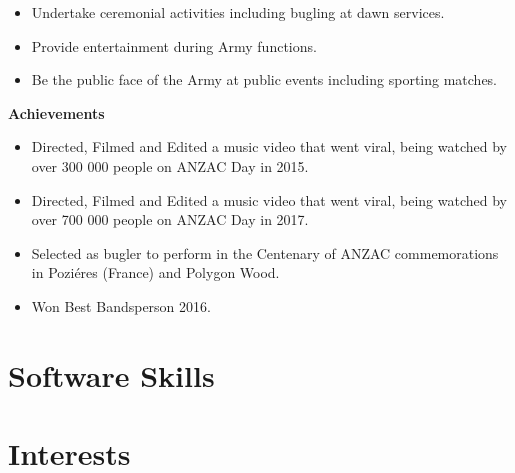 {}{}
{%
\begin{itemize}
  \item Undertake ceremonial activities including bugling at dawn services.
  \item Provide entertainment during Army functions.
  \item Be the public face of the Army at public events including sporting matches.
\end{itemize}
\textbf{Achievements}
\begin{itemize}
  \item Directed, Filmed and Edited a music video  that went viral, being watched by over 300 000 people on ANZAC Day in 2015.
  \item Directed, Filmed and Edited a music video  that went viral, being watched by over 700 000 people on ANZAC Day in 2017.
  \item Selected as bugler to perform in the Centenary of ANZAC commemorations in Poziéres (France) and Polygon Wood.
  \item Won Best Bandsperson 2016.
\end{itemize}
}
\vspace{1em}

\section{Software Skills}


\section{Interests}

\vspace{2em}



